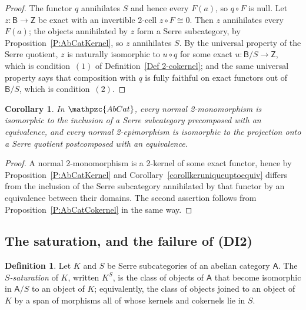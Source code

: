 \documentclass[reqno,a4paper]{amsart}
\numberwithin{equation}{section}
\theoremstyle{plain}
\newtheorem{corollary}[subsection]{Corollary}
\theoremstyle{definition}
\newtheorem{definition}[subsection]{Definition}
\def\nameit#1{\textrm{#1}~}
\def\prox{\nameit{Proposition}}
\def\corx{\nameit{Corollary}}
\def\defx{\nameit{Definition}}
\def\dfn#1{{\itshape #1}}
\newcommand{\comp}{\circ}
\newcommand{\iso}{\cong}
\newcommand{\catfont}[1]{\ensuremath{\mathpzc{#1}}\xspace}
\newcommand{\onecat}[1]{\ensuremath{\mathsf{#1}}\xspace}
\newcommand{\AbCat}{\catfont{AbCat}}
\renewcommand{\1}{\onecat{1}}
\begin{document}
\begin{proof}
	The functor \(q\) annihilates \(S\) and hence every \(F(a)\), so \(q\comp F\) is null. Let \(z\colon\onecat{B}\to\onecat{Z}\) be exact with an invertible 2-cell \(z\comp F\iso 0\). Then \(z\) annihilates every \(F(a)\); the objects annihilated by \(z\) form a Serre subcategory, by \prox\ref{P:AbCatKernel}, so \(z\) annihilates \(S\). By the universal property of the Serre quotient, \(z\) is naturally isomorphic to \(u\comp q\) for some exact \(u\colon\onecat{B}/S\to\onecat{Z}\), which is condition~\((1)\) of \defx\ref{Def 2-cokernel}; and the same universal property says that composition with \(q\) is fully faithful on exact functors out of \(\onecat{B}/S\), which is condition~\((2)\).
\end{proof}

\begin{corollary}\label{C:AbCatNormal}
	In \(\AbCat\), every normal 2-monomorphism is isomorphic to the inclusion of a Serre subcategory precomposed with an equivalence, and every normal 2-epimorphism is isomorphic to the projection onto a Serre quotient postcomposed with an equivalence.
\end{corollary}

\begin{proof}
	A normal 2-monomorphism is a 2-kernel of some exact functor, hence by \prox\ref{P:AbCatKernel} and \corx\ref{corollkeruniqueuptoequiv} differs from the inclusion of the Serre subcategory annihilated by that functor by an equivalence between their domains. The second assertion follows from \prox\ref{P:AbCatCokernel} in the same way.
\end{proof}

\subsection{The saturation, and the failure of \textup{(DI2)}}\label{SS:ModelSaturation}

\begin{definition}\label{D:Saturation}
	Let \(K\) and \(S\) be Serre subcategories of an abelian category \(\onecat{A}\). The \dfn{\(S\)-saturation} of \(K\), written \(K^{S}\), is the class of objects of \(\onecat{A}\) that become isomorphic in \(\onecat{A}/S\) to an object of \(K\); equivalently, the class of objects joined to an object of \(K\) by a span of morphisms all of whose kernels and cokernels lie in \(S\).
\end{definition}
\end{document}
